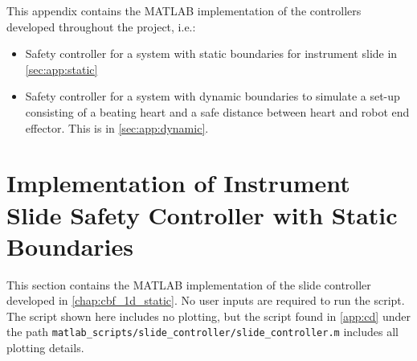 This appendix contains the MATLAB implementation of the controllers developed throughout the project, i.e.:
\begin{itemize}
\item Safety controller for a system with static boundaries for instrument slide in \autoref{sec:app:static}
\item Safety controller for a system with dynamic boundaries to simulate a set-up consisting of a beating heart and a safe distance between heart and robot end effector. This is in \autoref{sec:app:dynamic}.
\end{itemize}
\section{Implementation of Instrument Slide Safety Controller with Static Boundaries}\label{sec:app:static}
This section contains the MATLAB implementation of the slide controller developed in \autoref{chap:cbf_1d_static}. No user inputs are required to run the script. The script shown here includes no plotting, but the script found in \autoref{app:cd} under the path \texttt{matlab\_scripts/slide\_controller/slide\_controller.m} includes all plotting details.\\

